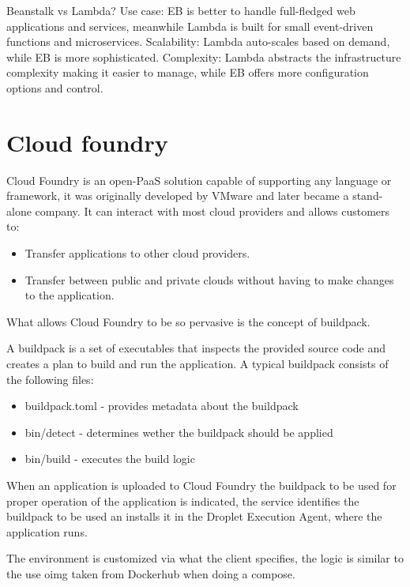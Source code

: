 Beanstalk vs Lambda?
Use case: EB is better to handle full-fledged web applications and services, meanwhile Lambda is built for
small event-driven functions and microservices.
Scalability: Lambda auto-scales based on demand, while EB is more sophisticated.
Complexity: Lambda abstracts the infrastructure complexity making it easier to manage, while EB
offers more configuration options and control.

\section{Cloud foundry}
Cloud Foundry is an open-PaaS solution capable of supporting any language or framework, it was originally developed by VMware and later became a stand-alone company. It can interact with most cloud providers and allows customers to:
\begin{itemize}
	\item Transfer applications to other cloud providers.
	\item Transfer between public and private clouds without having to make changes to the application.
\end{itemize}
What allows Cloud Foundry to be so pervasive is the concept of buildpack.

A buildpack is a set of executables that inspects the provided source code and creates a plan to build and run the application. A typical buildpack consists of the following files:
\begin{itemize}
	\item \textsf{buildpack.toml} - provides metadata about the buildpack
	\item \textsf{bin/detect} - determines wether the buildpack should be applied
	\item \textsf{bin/build} - executes the build logic
\end{itemize}
When an application is uploaded to Cloud Foundry the buildpack to be used for proper operation of the application is indicated, the service identifies the buildpack to be used an installs it in the Droplet Execution Agent, where the application runs.

The environment is customized via what the client specifies, the logic is similar to the use oimg taken from Dockerhub when doing a compose.

